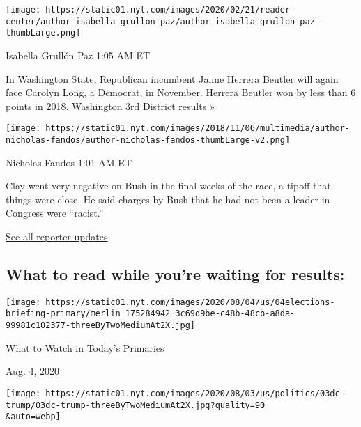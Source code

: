 \texttt{[image: https://static01.nyt.com/images/2020/02/21/reader-center/author-isabella-grullon-paz/author-isabella-grullon-paz-thumbLarge.png]}

Isabella Grullón Paz 1:05 AM ET

In Washington State, Republican incumbent Jaime Herrera Beutler will
again face Carolyn Long, a Democrat, in November. Herrera Beutler won by
less than 6 points in 2018.
\href{https://www.nytimes.com/interactive/2020/08/04/us/elections/results-washington-house-district-3-primary-election.html?action=click\&module=ELEX_results\&pgtype=Interactive\&region=ReporterUpdates}{Washington
3rd District results »}

\texttt{[image: https://static01.nyt.com/images/2018/11/06/multimedia/author-nicholas-fandos/author-nicholas-fandos-thumbLarge-v2.png]}

Nicholas Fandos 1:01 AM ET

Clay went very negative on Bush in the final weeks of the race, a tipoff
that things were close. He said charges by Bush that he had not been a
leader in Congress were ``racist.''

\href{https://www.nytimes.com/interactive/2020/08/04/us/elections/live-analysis-arizona-kansas-michigan-missouri-primaries.html?action=click\&module=ELEX_results\&pgtype=Interactive\&region=Component}{See
all reporter updates}

\hypertarget{what-to-read-while-youre-waiting-for-results}{%
\subsection{What to read while you're waiting for
results:}\label{what-to-read-while-youre-waiting-for-results}}

\href{https://www.nytimes.com/2020/08/04/us/elections/primary-election-michigan-arizona-kansas.html?action=click\&module=ELEX_results\&pgtype=Interactive\&region=RelatedCoverage}{}

\texttt{[image: https://static01.nyt.com/images/2020/08/04/us/04elections-briefing-primary/merlin\_175284942\_3c69d9be-c48b-48cb-a8da-99981c102377-threeByTwoMediumAt2X.jpg]}

What to Watch in Today's Primaries

Aug. 4, 2020

\href{https://www.nytimes.com/2020/08/03/us/politics/trump-mail-in-voting.html?action=click\&module=ELEX_results\&pgtype=Interactive\&region=RelatedCoverage}{}

\texttt{[image: https://static01.nyt.com/images/2020/08/03/us/politics/03dc-trump/03dc-trump-threeByTwoMediumAt2X.jpg?quality=90\\\&auto=webp]}

